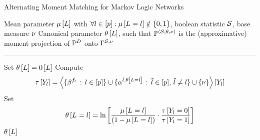 
\begin{algorithm}[hbt!]
    \caption{Alternating Moment Matching for Markov Logic Networks}\label{alg:AMM_MLN}
    \begin{algorithmic}
        \Require Mean parameter $\mu\left[L\right]$ with $\forall{l\in[p]}:{\mu\left[L_{}=l_{}\right]\notin\{0,1\}}$, boolean statistic $\mathcal{S}$, base measure $\nu$
        \Ensure Canonical parameter $\theta\left[L\right]$, such that $\mathbb{P}^{(\mathcal{S},\theta,\nu)}$ is the (approximative) moment projection of $\mathbb{P}^{D}$ onto $\Gamma^{\mathcal{S},\nu}$
        \hrule
        \State Set $\theta\left[L\right]=0\left[L\right]$
            \For{$\selindex\in\secnodes$}
                \State Compute
                \begin{align*}
                    \tau\left[Y_{l}\right]
                    = \left\langle \{\beta^{f_{l}} \,:\, l\in[p]\}
                    \cup\{\alpha^{\tilde{l},\theta\left[L=\tilde{l}\right]} \,:\, \tilde{l}\in[p],\,\tilde{l}\neq l\}
                    \cup\{\nu\}\right\rangle \left[ Y_{l} \right]
                \end{align*}
                \State Set
                \begin{align*}
                    \theta\left[L_{}=l_{}\right] = \ln \left[ 
                        \frac{\mu\left[L_{}=l_{}\right]}{(1-\mu\left[L_{}=l_{}\right])}
                        \cdot \frac{\tau\left[Y_{l}=0\right]}{\tau\left[Y_{l}=1\right]}
                     \right]
                \end{align*}
            \EndFor
        \EndWhile
        \State \Return $\theta\left[L\right]$
    \end{algorithmic}
\end{algorithm}


